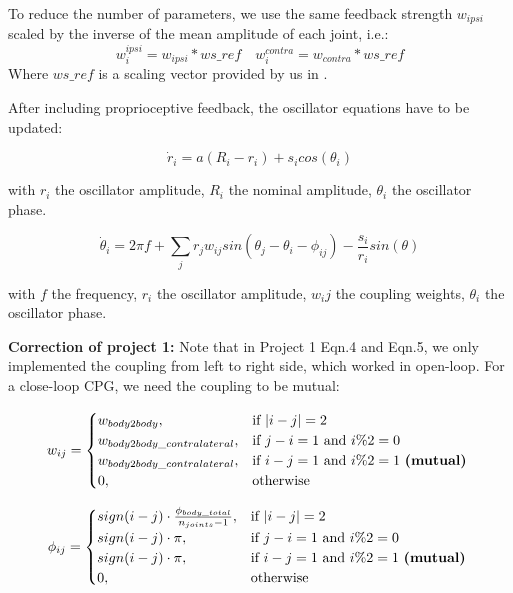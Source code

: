 \documentclass{cmc}
\begin{document}
To reduce the number of parameters, we use the same feedback strength $w_{ipsi}$ scaled by the inverse of the mean amplitude of each joint, i.e.:
\begin{equation}
  \label{eq:dphase}
  w_i^{ipsi} = w_{ipsi}*ws\_ref \quad
  w_i^{contra} = w_{contra}*ws\_ref
\end{equation}
Where $ws\_ref$ is a scaling vector provided by us in .

After including proprioceptive feedback, the oscillator equations have to be updated:


\begin{equation}
  \label{eq:damplitude}
  \dot{r}_i = a(R_i-r_i)+s_icos(\theta_i)
\end{equation}

with $ r_i $ the
oscillator amplitude, $ R_i $ the nominal amplitude, $\theta_i$ the oscillator phase.

\begin{equation}
  \label{eq:dphase}
  \dot{\theta}_i = 2 \pi f + \sum_j r_j w_{ij} sin(\theta_j - \theta_i - \phi_{ij}) - \frac{s_i}{r_i}sin(\theta)
\end{equation}

with $ f $ the frequency, $ r_i $ the
oscillator amplitude, $ w_ij $ the coupling weights, $\theta_i$ the oscillator phase.

\textbf{Correction of project 1: }
Note that in Project 1 Eqn.4 and Eqn.5, we only implemented the coupling from left to right side, which worked in open-loop. For a close-loop CPG, we need the coupling to be mutual:

\begin{equation}
  \label{eq:dcw}
  w_{ij} =
    \begin{cases}
    w_{body2body},& \text{if } |i-j|=2 \\
    w_{body2body\_contralateral}, & \text{if }  j-i=1 \text{ and } i\%2=0\\
    w_{body2body\_contralateral}, & \text{if }  i-j=1 \text{ and } i\%2=1 \text{ \textbf{(mutual)} }\\
    0, & \text{otherwise} \\
    \end{cases}
\end{equation}

\begin{equation}
  \label{eq:phicw}
  \phi_{ij} =
    \begin{cases}
    sign(i-j)\cdot\frac{\phi_{body\_total}}{n_{joints}-1},& \text{if } |i-j|=2 \\
    sign(i-j)\cdot\pi,&  \text{if }  j-i=1 \text{ and } i\%2=0\\
    sign(i-j)\cdot\pi,& \text{if }   i-j=1 \text{ and } i\%2=1 \text{ \textbf{(mutual)} }\\
    0, & \text{otherwise} \\
    \end{cases}
\end{equation}
\end{document}
